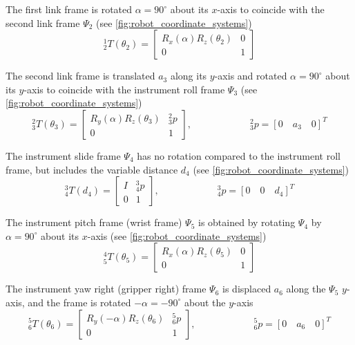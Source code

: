 The first link frame is rotated $\alpha=90^\circ$ about its $x$-axis to coincide with the second link frame $\Psi_2$ (see \autoref{fig:robot_coordinate_systems})
\begin{equation}
^1_2 T(\theta_2) = 
\begin{bmatrix}
R_x(\alpha) R_z(\theta_2) & 0\\
0 & 1
\end{bmatrix} 
\end{equation}

The second link frame is translated $a_3$ along its $y$-axis and rotated $\alpha=90^\circ$ about its $y$-axis to coincide with the instrument roll frame $\Psi_3$ (see \autoref{fig:robot_coordinate_systems})
\begin{equation}
^2_3 T(\theta_3) = 
\begin{bmatrix}
R_y(\alpha)R_z(\theta_3) & ^2_3p\\
0 & 1
\end{bmatrix}, 
\qquad\qquad\qquad
^2_3p = [0 \quad a_3 \quad 0]^T
\end{equation}

The instrument slide frame $\Psi_4$ has no rotation compared to the instrument roll frame, but includes the variable distance $d_4$ (see \autoref{fig:robot_coordinate_systems})
\begin{equation}
^3_4 T(d_4) = 
\begin{bmatrix}
I & ^3_4p\\
0 & 1
\end{bmatrix}, 
\qquad\qquad\qquad
^3_4p = [0 \quad 0 \quad d_4]^T
\end{equation}

The instrument pitch frame (wrist frame) $\Psi_5$ is obtained by rotating $\Psi_4$ by $\alpha=90^\circ$ about its $x$-axis (see \autoref{fig:robot_coordinate_systems})
\begin{equation}
^4_5 T(\theta_5) = 
\begin{bmatrix}
R_x(\alpha)R_z(\theta_5) & 0\\
0 & 1
\end{bmatrix}
\end{equation}

The instrument yaw right (gripper right) frame $\Psi_6$ is displaced $a_6$ along the $\Psi_5$ $y$-axis, and the frame is rotated $-\alpha=-90^\circ$ about the $y$-axis
\begin{equation}
^5_6 T(\theta_6) = 
\begin{bmatrix}
R_y(-\alpha)R_z(\theta_6) & ^5_6p\\
0 & 1
\end{bmatrix}, 
\qquad\qquad\qquad
^5_6p = [0 \quad a_6 \quad 0]^T
\end{equation}

